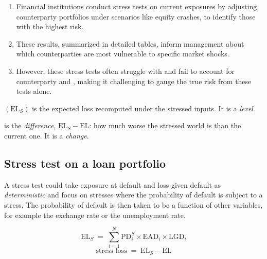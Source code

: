 
\begin{enumerate}[label=\alph*)]
\item Financial institutions conduct stress tests on current exposures by
adjusting counterparty portfolios under scenarios like equity crashes, to
identify those with the highest risk.
\item These results, summarized in detailed tables, inform management about which
counterparties are most vulnerable to specific market shocks.
\item However, these stress tests often struggle with 
and fail to account for counterparty  and , making it challenging to gauge the true risk from these tests alone.
\end{enumerate}


\begin{crdefbox}
 $(\mathrm{EL}_S)$ is the expected loss recomputed
under the stressed inputs. It is a \emph{level}.

\smallskip
{} is the \emph{difference}, $\mathrm{EL}_S - \mathrm{EL}$: how
much worse the stressed world is than the current one. It is a \emph{change}.
\end{crdefbox}

\subsection*{Stress test on a loan portfolio}

A stress test could take exposure at default and loss given default as
\emph{deterministic} and focus on stresses where the probability of default is
subject to a stress. The probability of default is then taken to be a function of
other variables, for example the exchange rate or the unemployment rate.

\begin{crfmlbox}
\[ \mathrm{EL}_S \;=\; \sum_{i=1}^{N} \mathrm{PD}_i^{S}\times \mathrm{EAD}_i
   \times \mathrm{LGD}_i \]
\[ \text{stress loss} \;=\; \mathrm{EL}_S - \mathrm{EL} \]
\end{crfmlbox}

